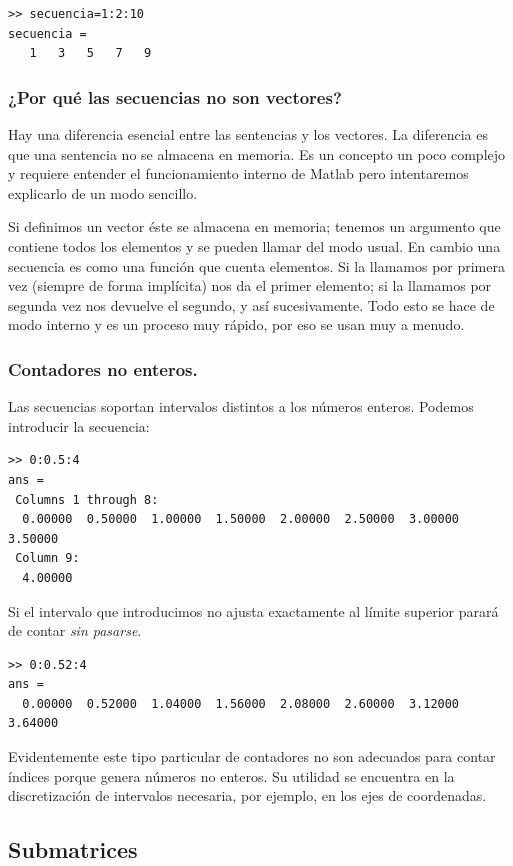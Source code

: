 \begin{verbatim}
>> secuencia=1:2:10
secuencia =
   1   3   5   7   9
\end{verbatim}

\subsubsection{¿Por qué las secuencias no son vectores?}

Hay una diferencia esencial entre las sentencias y los vectores. La
diferencia es que una sentencia no se almacena en memoria. Es un
concepto un poco complejo y requiere entender el funcionamiento
interno de Matlab pero intentaremos explicarlo de un modo sencillo.

Si definimos un vector éste se almacena en memoria; tenemos un
argumento que contiene todos los elementos y se pueden llamar del modo
usual.  En cambio una secuencia es como una función que cuenta
elementos.  Si la llamamos por primera vez (siempre de forma
implícita) nos da el primer elemento; si la llamamos por segunda vez
nos devuelve el segundo, y así sucesivamente. Todo esto se hace de
modo interno y es un proceso muy rápido, por eso se usan muy a menudo.


\subsubsection{Contadores no enteros.}

Las secuencias soportan intervalos distintos a los números enteros.
Podemos introducir la secuencia:

\begin{verbatim}
>> 0:0.5:4
ans =
 Columns 1 through 8:
  0.00000  0.50000  1.00000  1.50000  2.00000  2.50000  3.00000  3.50000
 Column 9:
  4.00000
\end{verbatim}

Si el intervalo que introducimos no ajusta exactamente al límite
superior parará de contar \emph{sin pasarse}.

\begin{verbatim}
>> 0:0.52:4
ans =
  0.00000  0.52000  1.04000  1.56000  2.08000  2.60000  3.12000  3.64000
\end{verbatim}
Evidentemente este tipo particular de contadores no son adecuados para
contar índices porque genera números no enteros. Su utilidad
se encuentra en la discretización de intervalos necesaria, por ejemplo,
en los ejes de coordenadas.


\subsection{Submatrices}

